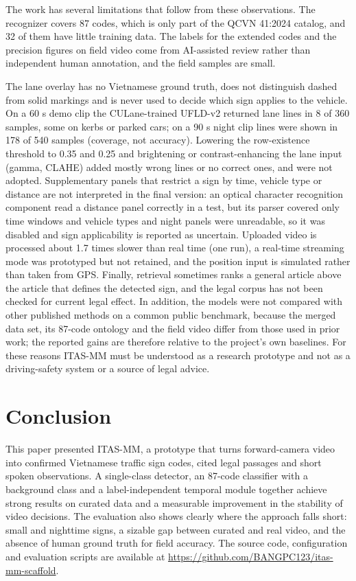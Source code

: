 \documentclass[conference,a4paper]{IEEEtran}
\begin{document}
The work has several limitations that follow from these observations. The recognizer covers 87 codes, which is only part of the QCVN 41:2024 catalog, and 32 of them have little training data. The labels for the extended codes and the precision figures on field video come from AI-assisted review rather than independent human annotation, and the field samples are small.

The lane overlay has no Vietnamese ground truth, does not distinguish dashed from solid markings and is never used to decide which sign applies to the vehicle. On a 60 s demo clip the CULane-trained UFLD-v2 returned lane lines in 8 of 360 samples, some on kerbs or parked cars; on a 90 s night clip lines were shown in 178 of 540 samples (coverage, not accuracy). Lowering the row-existence threshold to 0.35 and 0.25 and brightening or contrast-enhancing the lane input (gamma, CLAHE) added mostly wrong lines or no correct ones, and were not adopted. Supplementary panels that restrict a sign by time, vehicle type or distance are not interpreted in the final version: an optical character recognition component read a distance panel correctly in a test, but its parser covered only time windows and vehicle types and night panels were unreadable, so it was disabled and sign applicability is reported as uncertain. Uploaded video is processed about 1.7 times slower than real time (one run), a real-time streaming mode was prototyped but not retained, and the position input is simulated rather than taken from GPS. Finally, retrieval sometimes ranks a general article above the article that defines the detected sign, and the legal corpus has not been checked for current legal effect. In addition, the models were not compared with other published methods on a common public benchmark, because the merged data set, its 87-code ontology and the field video differ from those used in prior work; the reported gains are therefore relative to the project's own baselines. For these reasons ITAS-MM must be understood as a research prototype and not as a driving-safety system or a source of legal advice.

\section{Conclusion}\label{sec:conclusion}

This paper presented ITAS-MM, a prototype that turns forward-camera video into confirmed Vietnamese traffic sign codes, cited legal passages and short spoken observations. A single-class detector, an 87-code classifier with a background class and a label-independent temporal module together achieve strong results on curated data and a measurable improvement in the stability of video decisions. The evaluation also shows clearly where the approach falls short: small and nighttime signs, a sizable gap between curated and real video, and the absence of human ground truth for field accuracy. The source code, configuration and evaluation scripts are available at \url{https://github.com/BANGPC123/itas-mm-scaffold}.
\end{document}

